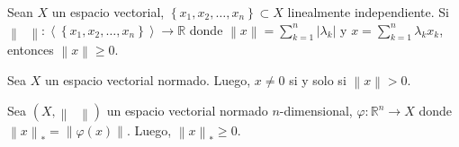 \begin{prob}
	\label{prob6}
	Sean $X$ un espacio vectorial,
	\begin{math}
		\left\{
		x_{1},
		x_{2},
		\dotsc,
		x_{n}
		\right\}\subset
		X
	\end{math}
	linealmente independiente.
	Si
	\begin{math}
		\left\|
		\phantom{\cdot}
		\right\|\colon
		\left\langle
		\left\{
		x_{1},
		x_{2},
		\dotsc,
		x_{n}
		\right\}
		\right\rangle\to
		\mathbb{R}
	\end{math}
	donde
	\begin{math}
		\left\|
		x
		\right\|=
		\sum_{k=1}^{n}
		\left|
		\lambda_{k}
		\right|
	\end{math}
	y
	\begin{math}
		x=
		\sum_{k=1}^{n}
		\lambda_{k}x_{k}
	\end{math},
	entonces
	\begin{math}
		\left\|
		x
		\right\|\geq
		0
	\end{math}.
\end{prob}

\begin{prob}
	\label{prob7}
	Sea $X$ un espacio vectorial normado.
	Luego, $x\neq 0$ si y solo si
	\begin{math}
		\left\|
		x
		\right\|>
		0
	\end{math}.
\end{prob}

\begin{prob}
	\label{prob8}
	Sea
	\begin{math}
		\left(
		X,
		\left\|
		\phantom{\cdot}
		\right\|
		\right)
	\end{math}
	un espacio vectorial normado $n$-dimensional,
	\begin{math}
		\varphi\colon
		\mathbb{R}^{n}\to
		X
	\end{math}
	donde
	\begin{math}
		{\left\|x\right\|}_{\ast}=
		\left\|
		\varphi
		\left(
		x
		\right)
		\right\|
	\end{math}.
	Luego,
	\begin{math}
		{\left\|x\right\|}_{\ast}\geq
		0
	\end{math}.
\end{prob}

